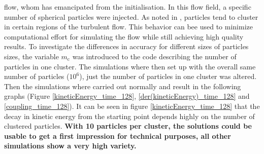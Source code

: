 \documentclass[a4paper,12pt]{article}
\numberwithin{equation}{section} %
\begin{document}
flow, whom has emancipated from the initialisation. In this flow field, a specific number of spherical particles were injected. 
\newline
As noted in \cite{PreferentialConcentrationOfHeavyParticles}, particles tend to cluster in certain regions of the turbulent flow. This behavior can bee used to minimize computational effort for simulating the flow while still achieving high quality results. To investigate the differences in accuracy for different sizes of particles sizes, the variable $m_\mathrm{c}$ was introduced to the code describing the number of particles in one cluster. The simulations where then set up with the overall same number of particles ($ 10^6 $), just the number of particles in one cluster was altered. Then the simulations where carried out normally and result in the following graphs (Figure \ref{kineticEnergy_time_128}, \ref{der(kineticEnergy)_time_128} and \ref{coupling_time_128}). 
It can be seen in figure \ref{kineticEnergy_time_128} that the decay in kinetic energy from the starting point depends highly on the number of clustered particles. \textbf{With 10 particles per cluster, the solutions could be usable to get a first impression for technical purposes, all other simulations show a very high variety.}
\newline
\end{document}
